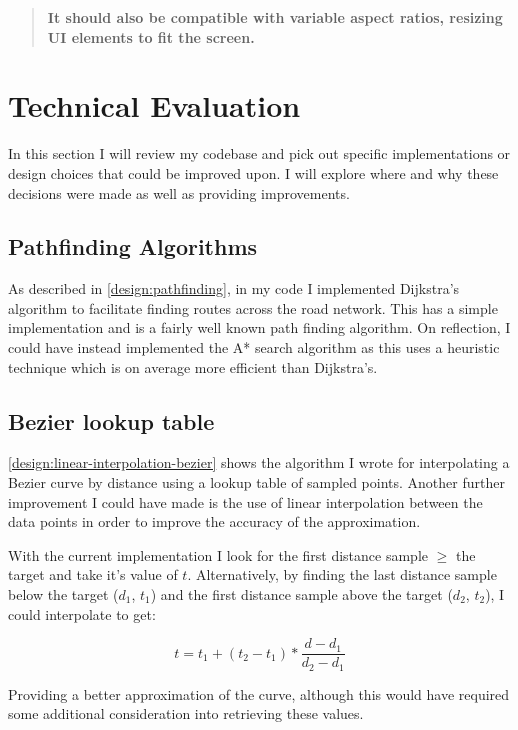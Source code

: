         \begin{quote}
            \textbf{It should also be compatible with variable aspect ratios, resizing UI elements to fit the screen.}
        \end{quote}

\section{Technical Evaluation}

    In this section I will review my codebase and pick out specific implementations or design choices that could be improved upon. I will explore where and why these decisions were made as well as providing improvements.

    \subsection{Pathfinding Algorithms}

        As described in \autoref{design:pathfinding}, in my code I implemented Dijkstra's algorithm to facilitate finding routes across the road network. This has a simple implementation and is a fairly well known path finding algorithm. On reflection, I could have instead implemented the A* search algorithm as this uses a heuristic technique which is on average more efficient than Dijkstra's.

    \subsection{Bezier lookup table}

        \autoref{design:linear-interpolation-bezier} shows the algorithm I wrote for interpolating a Bezier curve by distance using a lookup table of sampled points. Another further improvement I could have made is the use of linear interpolation between the data points in order to improve the accuracy of the approximation.

        With the current implementation I look for the first distance sample $\geq$ the target and take it's value of $t$. Alternatively, by finding the last distance sample below the target ($d_1$, $t_1$) and the first distance sample above the target ($d_2$, $t_2$), I could interpolate to get:

        \[t = t_1 + (t_2 - t_1) * \frac{d - d_1}{d_2 - d_1}\]

        Providing a better approximation of the curve, although this would have required some additional consideration into retrieving these values.

